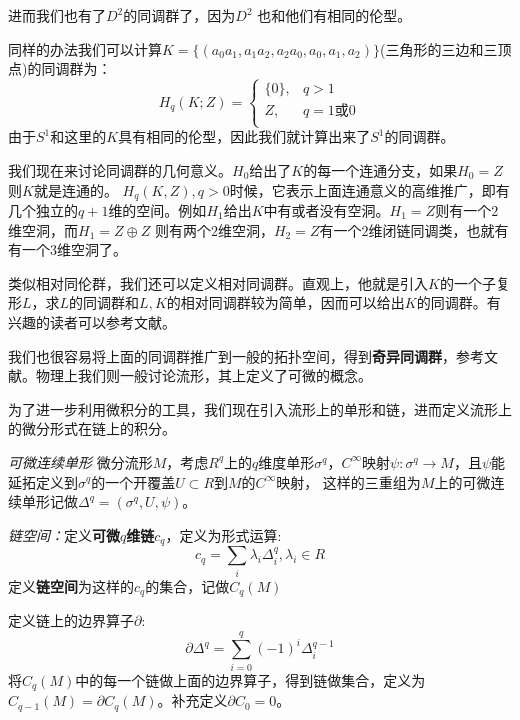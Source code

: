 \documentclass[supercite]{HustGraduPaper}
\begin{document}
\begin{appendices}
		进而我们也有了$D^2$的同调群了，因为$D^2$
		也和他们有相同的伦型。
		
		同样的办法我们可以计算$K = \{(a_0a_1, a_1a_2, a_2a_0,a_0,a_1,a_2)\}$(三角形的三边和三顶点)的同调群为：
		\begin{equation}
		H_q(K;Z) = \begin{cases}
		\{0\}, &q>1\\
		Z, &q=1 \text{或} 0\\
		\end{cases}
		\end{equation}
		由于$S^1$和这里的$K$具有相同的伦型，因此我们就计算出来了$S^1$的同调群。
		
		我们现在来讨论同调群的几何意义。$H_0$给出了$K$的每一个连通分支，如果$H_0 = Z$则$K$就是连通的。 $H_q(K,Z), q>0$时候，它表示上面连通意义的高维推广，即有几个独立的$q+1$维的空间。例如$H_1$给出$K$中有或者没有空洞。$H_1 = Z$则有一个$2$维空洞，而$H_1 = Z \oplus Z$
		则有两个$2$维空洞，$H_2 = Z$有一个$2$维闭链同调类，也就有有一个$3$维空洞了。
		
		类似相对同伦群，我们还可以定义相对同调群。直观上，他就是引入$K$的一个子复形$L$，求$L$的同调群和$L,K$的相对同调群较为简单，因而可以给出$K$的同调群。有兴趣的读者可以参考文献\cite{扬政1998物理学中的几何方法}。
		
		我们也很容易将上面的同调群推广到一般的拓扑空间，得到\textbf{奇异同调群}，参考文献\cite{扬政1998物理学中的几何方法}。物理上我们则一般讨论流形，其上定义了可微的概念。
		
		
		为了进一步利用微积分的工具，我们现在引入流形上的单形和链，进而定义流形上的微分形式在链上的积分。
		
		\textit{可微连续单形} 微分流形$M$，考虑$R^q$上的$q$维度单形$\sigma^q$，$C^\infty$映射$\psi: \sigma^q \to M$，且$\psi$能延拓定义到$\sigma^q$的一个开覆盖$U \subset R$到$M$的$C^\infty$映射，
		这样的三重组为$M$上的可微连续单形记做$\Delta^q = (\sigma^q,U,\psi)$。
		
		\textit{链空间：}定义\textbf{可微$q$维链$c_q$}，定义为形式运算:
		\begin{equation}
		c_q = \sum_{i} \lambda_i \Delta_i^q, \lambda_i \in R
		\end{equation}
		定义\textbf{链空间}为这样的$c_q$的集合，记做$C_q(M)$
		
		定义链上的边界算子$\partial:$
		\begin{equation}
		\partial \Delta^q = \sum_{i=0}^q (-1)^i \Delta_i^{q-1}
		\end{equation}
		将$C_q(M)$中的每一个链做上面的边界算子，得到链做集合，定义为$C_{q-1}(M ) = \partial C_q(M)$。补充定义$\partial C_0 = 0$。
		

\end{appendices}
\end{document}
